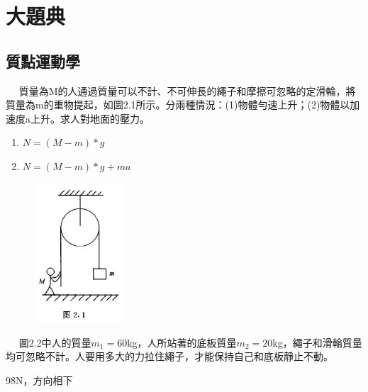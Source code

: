 \documentclass[cn,10pt,math=newtx,chinesefont=founder]{../elegantbook}
\begin{document}
\chapter{大題典}
\section{質點運動學}

\begin{example}　
    質量為M的人通過質量可以不計、不可伸長的繩子和摩擦可忽略的定滑輪，將質量為m的重物提起，如圖2.1所示。分兩種情況：(1)物體勻速上升；(2)物體以加速度a上升。求人對地面的壓力。
    
    \rightline{[2.1.1]}
\end{example}

\begin{solution}
\begin{enumerate}[label=(\arabic*)]
\item $N=(M-m)*g$
\item $N=(M-m)*g+ma$
\end{enumerate}
\end{solution}

\begin{figure}[htbp]
\flushright
\includegraphics[width=0.3\textwidth]{image/2.1.JPG}
\end{figure}

\newpage


\begin{example}　
    圖2.2中人的質量$m_1=60$kg，人所站著的底板質量$m_2=20$kg，繩子和滑輪質量均可忽略不計。人要用多大的力拉住繩子，才能保持自己和底板靜止不動。
    
    \rightline{[2.1.2]}
\end{example}

\begin{solution}
98N，方向相下
\end{solution}
\end{document}
